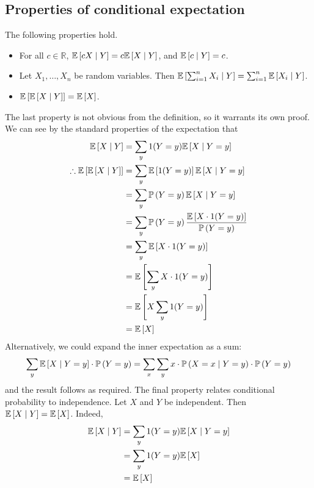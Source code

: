 \subsection{Properties of conditional expectation}
The following properties hold.
\begin{itemize}
	\item For all \(c \in \mathbb R\), \(\mathbb{E}\left[{cX \mid Y}\right] = c\mathbb{E}\left[{X \mid Y}\right]\), and \(\mathbb{E}\left[{c \mid Y}\right] = c\).
	\item Let \(X_1, \dots, X_n\) be random variables.
	      Then \(\mathbb{E}\left[{\sum_{i=1}^n X_i \mid Y}\right] = \sum_{i=1}^n \mathbb{E}\left[{X_i \mid Y}\right]\).
	\item \(\mathbb{E}\left[{\mathbb{E}\left[{X \mid Y}\right]}\right] = \mathbb{E}\left[{X}\right]\).
\end{itemize}
The last property is not obvious from the definition, so it warrants its own proof.
We can see by the standard properties of the expectation that
\begin{align*}
	\mathbb{E}\left[{X \mid Y}\right]                     & = \sum_y 1(Y = y) \mathbb{E}\left[{X \mid Y = y}\right]                              \\
	\therefore \mathbb{E}\left[{\mathbb{E}\left[{X \mid Y}\right]}\right] & = \sum_y \mathbb{E}\left[{1(Y = y)}\right] \mathbb{E}\left[{X \mid Y = y}\right]                     \\
	                                      & = \sum_y \mathbb{P}\left({Y = y}\right) \mathbb{E}\left[{X \mid Y = y}\right]                          \\
	                                      & = \sum_y \mathbb{P}\left({Y = y}\right) \frac{\mathbb{E}\left[{X \cdot 1(Y = y)}\right]}{\mathbb{P}\left({Y = y}\right)} \\
	                                      & = \sum_y \mathbb{E}\left[{X \cdot 1(Y = y)}\right]                                   \\
	                                      & = \mathbb{E}\left[{\sum_y X \cdot 1(Y = y)}\right]                                   \\
	                                      & = \mathbb{E}\left[{X \sum_y 1(Y = y)}\right]                                         \\
	                                      & = \mathbb{E}\left[{X}\right]                                                         \\
\end{align*}
Alternatively, we could expand the inner expectation as a sum:
\[
	\sum_y \mathbb{E}\left[{X \mid Y = y}\right] \cdot \mathbb{P}\left({Y = y}\right) = \sum_x \sum_y x \cdot \mathbb{P}\left({X = x \mid Y = y}\right) \cdot \mathbb{P}\left({Y = y}\right)
\]
and the result follows as required.
The final property relates conditional probability to independence.
Let \(X\) and \(Y\) be independent.
Then \(\mathbb{E}\left[{X \mid Y}\right] = \mathbb{E}\left[{X}\right]\).
Indeed,
\begin{align*}
	\mathbb{E}\left[{X \mid Y}\right] & = \sum_y 1(Y = y) \mathbb{E}\left[{X \mid Y = y}\right] \\
	                  & = \sum_y 1(Y = y) \mathbb{E}\left[{X}\right]            \\
	                  & = \mathbb{E}\left[{X}\right]                            \\
\end{align*}

